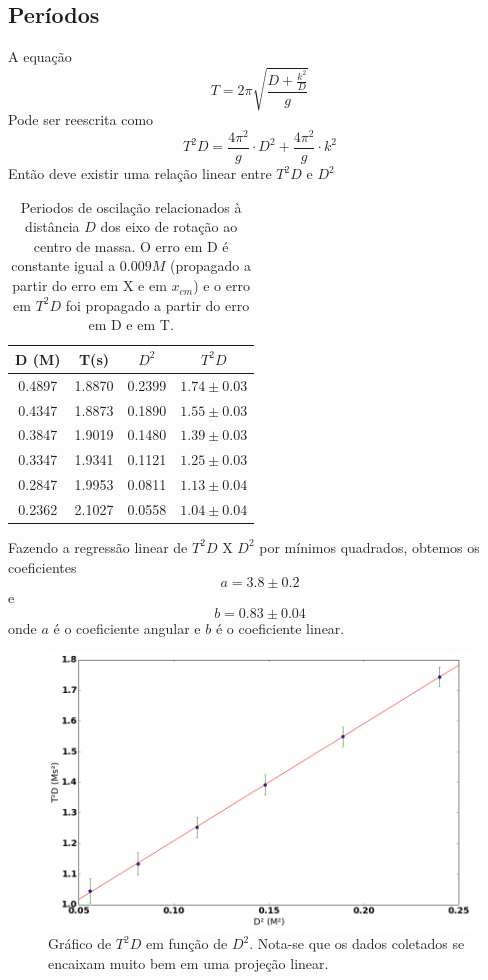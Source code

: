 \documentclass[12pt,a4paper]{article}
\begin{document}
\subsection{Períodos}
A equação $$ T = 2\pi\sqrt{\frac{D + \frac{k^2}{D}}{g}} $$ 
Pode ser reescrita como 
$$ T^2D = \frac{4\pi^2}{g} \cdot D^2 + \frac{4\pi^2}{g} \cdot k^2 $$ 
Então deve existir uma relação linear entre $T^2D$ e $D^2$


  
\begin{table}[!htbp]
\def\arraystretch{1.5}
\begin{tabular}{|c|c|c|c|}
\hline
D (M)& T(s) & $D^2$ & $T^2D$ \\
\hline
0.4897 & 1.8870 & 0.2399 & $1.74 \pm 0.03$\\
\hline
0.4347 & 1.8873 & 0.1890 & $1.55 \pm 0.03$\\
\hline
0.3847 & 1.9019 & 0.1480 & $1.39 \pm 0.03$\\
\hline
0.3347 & 1.9341 & 0.1121 & $1.25 \pm 0.03$\\
\hline
0.2847 & 1.9953 & 0.0811 & $1.13 \pm 0.04$\\
\hline
0.2362 & 2.1027 & 0.0558 & $1.04 \pm 0.04$\\
\hline
\end{tabular} 


\caption{Periodos de oscilação relacionados à distância $D$ dos eixo de rotação ao centro de massa. O erro em D é constante igual a $0.009 M$ (propagado a partir do erro em X e em $x_{cm}$) e o erro em $T^2D$ foi propagado a partir do erro em D e em T.}
\end{table}

Fazendo a regressão linear de $T^2D$ X $D^2$ por mínimos quadrados, obtemos os coeficientes $$ a = 3.8 \pm 0.2 $$ e $$ b = 0.83 \pm 0.04 $$ onde $a$ é o coeficiente angular e $b$ é o coeficiente linear.

\begin{figure}[h]
\caption{Gráfico de $T^2D$ em função de $D^2$. Nota-se que os dados coletados se encaixam muito bem em uma projeção linear.}
\includegraphics[scale=0.55]{index.png} 

\end{figure}
\end{document}
